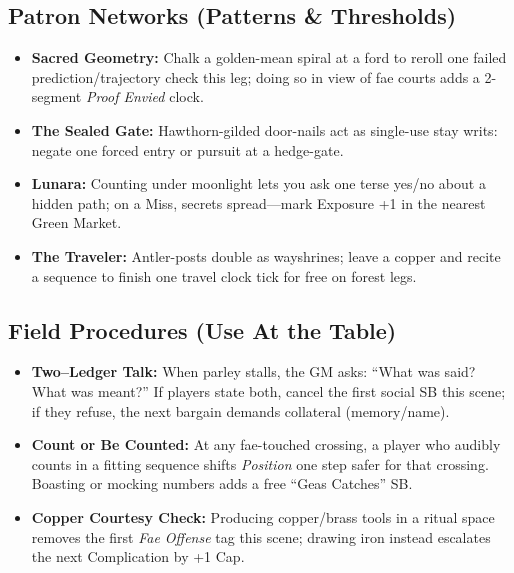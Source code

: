 \subsection*{Patron Networks (Patterns \& Thresholds)}
\begin{itemize}
  \item \textbf{Sacred Geometry:} Chalk a golden-mean spiral at a ford to reroll one failed prediction/trajectory check this leg; doing so in view of fae courts adds a 2-segment \emph{Proof Envied} clock.
  \item \textbf{The Sealed Gate:} Hawthorn-gilded door-nails act as single-use stay writs: negate one forced entry or pursuit at a hedge-gate.
  \item \textbf{Lunara:} Counting under moonlight lets you ask one terse yes/no about a hidden path; on a Miss, secrets spread—mark Exposure +1 in the nearest Green Market.
  \item \textbf{The Traveler:} Antler-posts double as wayshrines; leave a copper and recite a sequence to finish one travel clock tick for free on forest legs.
\end{itemize}

\subsection*{Field Procedures (Use At the Table)}
\begin{itemize}
  \item \textbf{Two–Ledger Talk:} When parley stalls, the GM asks: “What was said? What was meant?” If players state both, cancel the first social SB this scene; if they refuse, the next bargain demands collateral (memory/name).
  \item \textbf{Count or Be Counted:} At any fae-touched crossing, a player who audibly counts in a fitting sequence shifts \emph{Position} one step safer for that crossing. Boasting or mocking numbers adds a free “Geas Catches” SB.
  \item \textbf{Copper Courtesy Check:} Producing copper/brass tools in a ritual space removes the first \emph{Fae Offense} tag this scene; drawing iron instead escalates the next Complication by +1 Cap.
\end{itemize}

